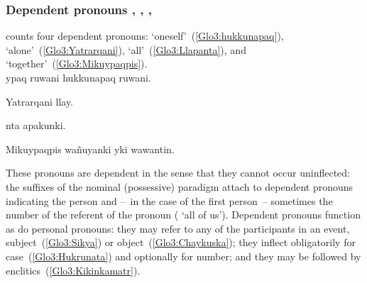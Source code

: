 {\subsubsection{Dependent pronouns , , , }\label{ssec:deppro}
\SYQ{} counts four dependent pronouns:  ‘oneself’~(\ref{Glo3:hukkunapaq}),  ‘alone’~(\ref{Glo3:Yatrarqani}),  ‘all’~(\ref{Glo3:Llapanta}), and  ‘together’~(\ref{Glo3:Mikuypaqpis}).\\

%
{ypaq ruwani hukkunapaq ruwani.}%
{}%
{}{}%

%
{Yatrarqani llay.}%
{}%
{}{}%

%
{nta apakunki.}%
{}%
{}{}%

%
{Mikuypaqpis wañuyanki yki wawantin.}%
{}%
{}{}%

\noindent
These pronouns are dependent in the sense that they cannot occur uninflected: the suffixes of the nominal (possessive) paradigm attach to dependent pronouns indicating the person and --~in the case of the first person~-- sometimes the number of the referent of the pronoun ( ‘all of us’). Dependent pronouns function as do personal pronouns: they may refer to any of the participants in an event, subject~(\ref{Glo3:Sikya}) or object~(\ref{Glo3:Chaykuska}); they inflect obligatorily for case~(\ref{Glo3:Hukrunata}) and optionally for number; and they may be followed by enclitics~(\ref{Glo3:Kikinkamatr}).\\

}
